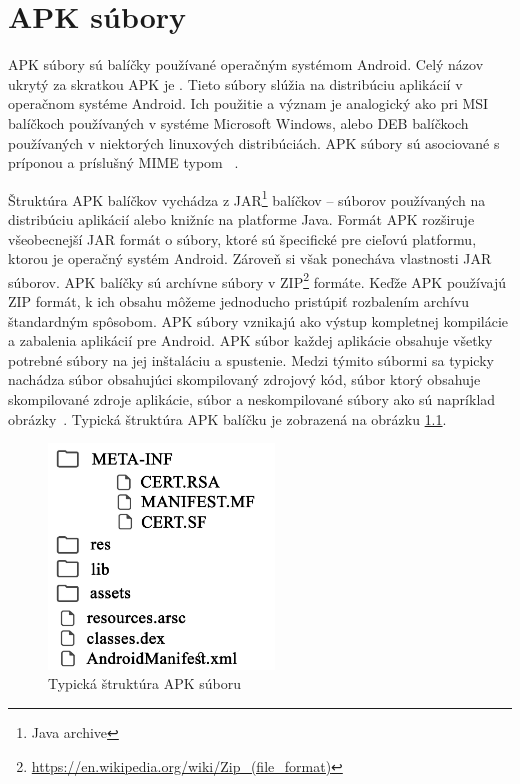 
\chapter{APK súbory}
\label{APKsubory}
APK súbory sú balíčky používané operačným systémom Android. Celý názov ukrytý za skratkou APK je . Tieto súbory slúžia na distribúciu aplikácií v operačnom systéme Android. Ich použitie a význam je analogický ako pri MSI balíčkoch používaných v systéme Microsoft Windows, alebo DEB balíčkoch používaných v niektorých linuxových distribúciách. APK súbory sú asociované s príponou  a príslušný MIME typom ~\cite{Freed2016}.

Štruktúra APK balíčkov vychádza z JAR\footnote{Java archive} balíčkov -- súborov používaných na distribúciu aplikácií alebo knižníc na platforme Java. Formát APK rozširuje všeobecnejší JAR formát o súbory, ktoré sú špecifické pre cieľovú platformu, ktorou je operačný systém Android. Zároveň si však ponecháva vlastnosti JAR súborov. APK balíčky sú archívne súbory v ZIP\footnote{\url{https://en.wikipedia.org/wiki/Zip\_(file_format)}} formáte.  Keďže APK používajú ZIP formát, k ich obsahu môžeme jednoducho pristúpiť rozbalením archívu štandardným spôsobom.  APK súbory vznikajú ako výstup kompletnej kompilácie a zabalenia aplikácií pre Android. APK súbor každej aplikácie obsahuje všetky potrebné súbory na jej inštaláciu a spustenie. Medzi týmito súbormi sa typicky nachádza súbor  obsahujúci skompilovaný zdrojový kód, súbor  ktorý obsahuje skompilované zdroje aplikácie, súbor  a neskompilované súbory ako sú napríklad obrázky~\cite{buildingAndRunning}. Typická štruktúra APK balíčku je zobrazená na obrázku \ref{fig:strukturaApk}.
\begin{figure}[htb]
  \begin{center}
    \includegraphics[width=60mm]{images/apkStructure.pdf}
  \end{center}
  \caption{Typická štruktúra APK súboru}
  \label{fig:strukturaApk}
\end{figure}

